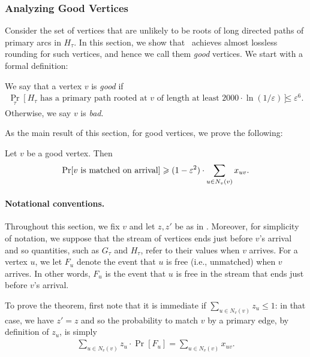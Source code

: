 \subsubsection{Analyzing Good Vertices}
\label{sec:boundvar}
Consider the set of vertices that are unlikely to be roots of long directed paths of primary arcs in $H_\tau$. 
In this section, we show that~ achieves almost lossless rounding for such vertices, and hence we
call them \emph{good} vertices.
We start with a formal definition:
\begin{Def}
We say that a vertex $v$ is \emph{good} if
\begin{align*}
\Pr_{\tau}[\mbox{$H_\tau$ has a primary path rooted at $v$ of length at least $2000 \cdot \ln(1/\varepsilon)$}]& \leq \varepsilon^6.
\end{align*}
Otherwise, we say $v$ is \emph{bad}.
\end{Def}

As the main result of this section, for good vertices, we prove the following:
\begin{thm}
	\label{thm:good_vertices}
	Let $v$ be a good vertex. Then 
	\begin{align*}
	\Pr[\mbox{$v$ is matched on arrival}] \geqslant (1-\varepsilon^2) \cdot \sum_{u\in N_v(v)} x_{uv}.
	\end{align*}
\end{thm}
\paragraph{Notational conventions.} Throughout this section, we fix $v$ and let $z, z'$ be as in . Moreover, for simplicity of notation, we suppose that the stream of vertices ends just before $v$'s arrival and so quantities, such as  $G_\tau$ and  $H_\tau$, refer to their values when $v$ arrives. For a vertex $u$, we let $F_u$ denote the event that $u$ is free (i.e., unmatched) when $v$ arrives. In other words, $F_u$ is the event that $u$ is free in the stream that ends just before $v$'s arrival. 

To prove the theorem, first note that it is immediate if $\sum_{u\in N_v(v)} z_u \leq 1$: in that case, we have $z' = z$ and so the probability to match $v$ by a primary edge, by definition of $z_u$, is simply
\begin{align*}
\sum_{u\in N_v(v)} z_u \cdot \Pr[F_u] = \sum_{u\in N_v(v)} x_{uv}.
\end{align*}


